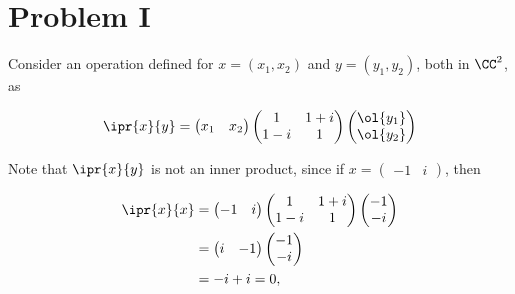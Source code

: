 \documentclass[11pt]{scrartcl}
\begin{document}
\section*{Problem I}

Consider an operation defined for $x= (x_1, x_2)$ and $y = (y_1, y_2)$, both in $\CC^2$, as

\begin{equation}
  \ipr{x}{y} =
  \begin{pmatrix}
    x_1 & x_2
  \end{pmatrix}
\begin{pmatrix}
  1 & 1+i\\
  1-i & 1
\end{pmatrix}
\begin{pmatrix}
  \ol{y_1}\\
  \ol{y_{2}}
\end{pmatrix}
\end{equation}

Note that $\ipr{x}{y}$ is not an inner product, since if
$x =
\begin{pmatrix}
-1 & i
\end{pmatrix}$, then

\begin{align}
  \ipr{x}{x}                       & =
               \begin{pmatrix}
                 -1                 & i
               \end{pmatrix}
                     \begin{pmatrix}
                       1           & 1+i   \\
                       1-i         & 1
                     \end{pmatrix}
                             \begin{pmatrix}
                               -1           \\
                               -i
                             \end{pmatrix} \\
                                   & =
                             \begin{pmatrix}
                               i & -1
                             \end{pmatrix}
                             \begin{pmatrix}
                               -1           \\
                               -i
                             \end{pmatrix} \\
                                   & = -i +i = 0,
\end{align}
\end{document}

